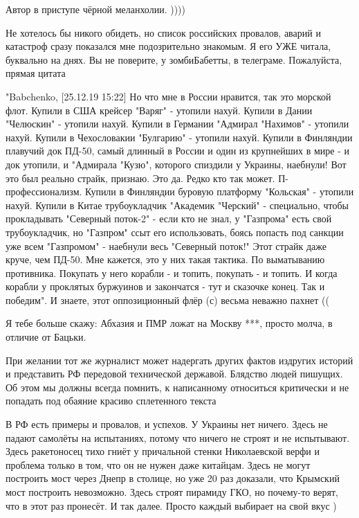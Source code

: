 \begin{itemize}
\begin{itemize}
\end{itemize} %

Автор в приступе чёрной меланхолии. ))))


Не хотелось бы никого обидеть, но список российских провалов, аварий и
катастроф сразу показался мне подозрительно знакомым. Я его УЖЕ читала,
буквально на днях. Вы не поверите, у зомбиБабетты, в телеграме. Пожалуйста,
прямая цитата

"Babchenko, [25.12.19 15:22]
Но что мне в России нравится, так это морской флот.
Купили в США крейсер "Варяг" - утопили нахуй.
Купили в Дании "Челюскин" - утопили нахуй.
Купили в Германии "Адмирал "Нахимов" - утопили нахуй.
Купили в Чехословакии "Булгарию" - утопили нахуй.
Купили в Финляндии плавучий док ПД-50, самый длинный в России и один из крупнейших в мире - и док утопили, и "Адмирала "Кузю", которого спиздили у Украины, наебнули! Вот это был реально страйк, признаю. Это да. Редко кто так может. П-профессионализм.
Купили в Финляндии буровую платформу "Кольская" - утопили нахуй.
Купили в Китае трубоукладчик "Академик "Черский" - специально, чтобы прокладывать "Северный поток-2" - если кто не знал, у "Газпрома" есть свой трубоукладчик, но "Газпром" ссыт его использовать, боясь попасть под санкции уже всем "Газпромом" - наебнули весь "Северный поток!"
Этот страйк даже круче, чем ПД-50.
Мне кажется, это у них такая тактика. По выматыванию противника. Покупать у него корабли - и топить, покупать - и топить. И когда корабли у проклятых буржуинов и закончатся - тут и сказочке конец.
Так и победим".
И знаете, этот оппозиционный флёр (с) весьма неважно пахнет ((

Я тебе больше скажу: Абхазия и ПМР ложат на Москву ***, просто молча, в отличие от Бацьки.


При желании тот же журналист может надергать других фактов издругих историй и
представить РФ передовой технической державой. Блядство людей пишущих. Об этом
мы должны всегда помнить, к написанному относиться критически и не попадать под
обаяние красиво сплетенного текста

\begin{itemize} %

В РФ есть примеры и провалов, и успехов. У Украины нет ничего. Здесь не падают
самолёты на испытаниях, потому что ничего не строят и не испытывают. Здесь
ракетоносец тихо гниёт у причальной стенки Николаевской верфи и проблема только
в том, что он не нужен даже китайцам. Здесь не могут построить мост через Днепр
в столице, но уже 20 раз доказали, что Крымский мост построить невозможно.
Здесь строят пирамиду ГКО, но почему-то верят, что в этот раз пронесёт. И так
далее. Просто каждый выбирает на свой вкус )


\end{itemize}
\end{itemize}
